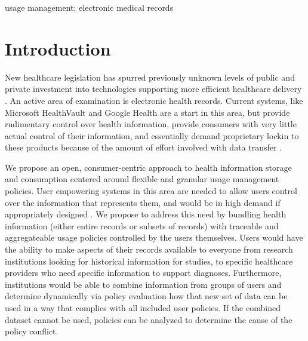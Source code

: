 \documentclass[10pt, conference, compsocconf]{IEEEtran}
\begin{document}
\begin{IEEEkeywords}
usage management; electronic medical records

\end{IEEEkeywords}


%
\IEEEpeerreviewmaketitle

\section*{Introduction}
New healthcare legislation has spurred previously unknown levels of public and private investment into technologies supporting more efficient healthcare delivery \cite{Emr:Web:Recovery}.   An active area of examination is electronic health records.  Current systems, like Microsoft HealthVault and Google Health are a start in this area, but provide rudimentary control over health information, provide consumers with very little actual control of their information, and essentially demand proprietary lockin to these products because of the amount of effort involved with data transfer \cite{Emr:EvaluationHealthInf}.

We propose an open, consumer-centric approach to health information storage and consumption centered around flexible and granular usage management policies.  User empowering systems in this area are needed to allow users control over the information that represents them, and would be in high demand if appropriately designed \cite{Emr:PyAmWaCr}.  We propose to address this need by bundling health information (either entire records or subsets of records) with traceable and aggregateable usage policies controlled by the users themselves.  Users would have the ability to make aspects of their records available to everyone from research institutions looking for historical information for studies, to specific healthcare providers who need specific information to support diagnoses.  Furthermore, institutions would be able to combine information from groups of users and determine dynamically via policy evaluation how that new set of data can be used in a way that complies with all included user policies.  If the combined dataset cannot be used, policies can be analyzed to determine the cause of the policy conflict.
\end{document}
